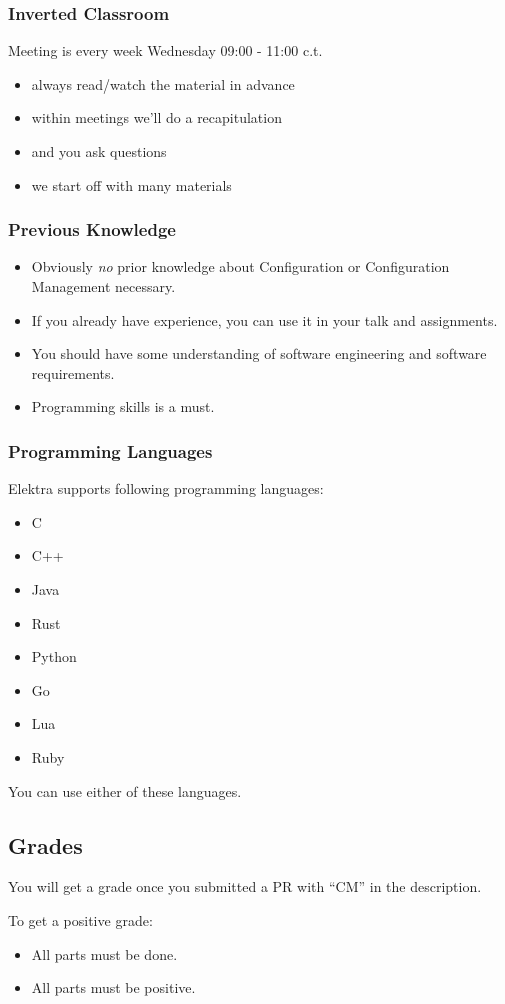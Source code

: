 \begin{frame}
	\frametitle{Inverted Classroom}
	Meeting is every week Wednesday 09:00 - 11:00 c.t.

	\begin{itemize}
		\item always read/watch the material in advance
		\item within meetings we'll do a recapitulation
		\item and you ask questions
		\item we start off with many materials
	\end{itemize}
\end{frame}

\begin{frame}
	\frametitle{Previous Knowledge}
	\begin{itemize}
		\item Obviously \textit{no} prior knowledge about Configuration or Configuration Management necessary.
		\item If you already have experience, you can use it in your talk and assignments.
		\item You should have some understanding of software engineering and software requirements.
		\item Programming skills is a must.
	\end{itemize}
\end{frame}

\begin{frame}
	\frametitle{Programming Languages}
	Elektra supports following programming languages:
	\begin{itemize}
		\item C
		\item C++
		\item Java
		\item Rust
		\item Python
		\item Go
		\item Lua
		\item Ruby
	\end{itemize}
	You can use either of these languages.
\end{frame}

\subsection{Grades}

\begin{frame}
	You will get a grade once you submitted a PR with ``CM'' in the description.
	\vspace{1cm}

	To get a positive grade:
	\begin{itemize}
		\item All parts must be done.
		\item All parts must be positive.
	\end{itemize}
\end{frame}

